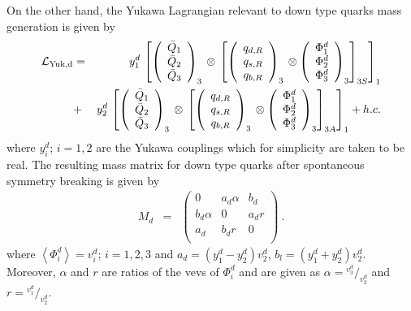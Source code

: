 \documentclass[english,10pt,aps,prd,a4paper,preprintnumbers,floatfix,nofootinbib,showpacs,superscriptaddress]{revtex4-1}
\newcommand*\rfrac[2]{{}^{#1}\!/_{#2}}
\def\vev#1{\left\langle #1\right\rangle}
\def\vev#1{\left\langle #1\right\rangle}
\def\vev#1{\left\langle #1\right\rangle}
\begin{document}
On the other hand, the Yukawa Lagrangian relevant to down type quarks
mass generation is given by
  \begin{eqnarray}
  \mathcal{L}_{\rm{Yuk}, d}  & = & y^d_1 \, \left[ \left( \begin{array}{c}  \bar{Q}_{1}   \\ \bar{Q}_{2} \\ \bar{Q}_{3} \end{array} \right)_3  \, \otimes \, \left [  \left( \begin{array}{c}  q_{d,R}   \\ q_{s, R} \\ q_{b, R} \end{array} \right)_3 \, \otimes  \left( \begin{array}{c} \Phi_1^d   \\ \Phi_2^d \\ \Phi_3^d \end{array} \right)_{3}   \right]_{3S} \right ]_1
    \nonumber \\
  &+&    y^d_2 \, \left[ \left( \begin{array}{c}  \bar{Q}_{1}   \\ \bar{Q}_{2} \\ \bar{Q}_{3} \end{array} \right)_3  \, \otimes \, \left [  \left( \begin{array}{c} q_{d,R}   \\ q_{s, R} \\ q_{b, R} \end{array} \right)_3 \, \otimes  \left( \begin{array}{c} \Phi_1^d   \\ \Phi_2^d \\ \Phi_3^d \end{array} \right)_{3}   \right]_{3A} \right ]_1 + h.c.
    \label{quarkyuk}
 \end{eqnarray}
%
 where $y^d_i$; $i = 1,2$ are the Yukawa couplings which for
 simplicity are taken to be real. The resulting mass matrix for down
 type quarks after spontaneous symmetry breaking is given by
  \begin{eqnarray}
   M_{d} & = & \left( 
\begin{array}{ccc}
0              & a_d \alpha      &   b_d       \\
b_d \alpha     & 0               &   a_d r     \\
a_d            & b_d r           &   0          \\  
\end{array}
\right)~.
   \label{gquarkmass}
  \end{eqnarray}
  \noindent
  where $\vev{ \Phi^d_i} = v^d_i$; $i = 1,2,3$ and
  $a_d = (y_1^d-y_2^d) v_2^d$, $b_l = (y_1^d +y_2^d) v_2^d$. Moreover,
  $\alpha$ and $r$ are ratios of the vevs of $\Phi^d_i$ and are given
  as $\alpha = \rfrac{v_3^d}{v_2^d}$ and $r = \rfrac{v_1^d}{v_2^d}$.
\end{document}

